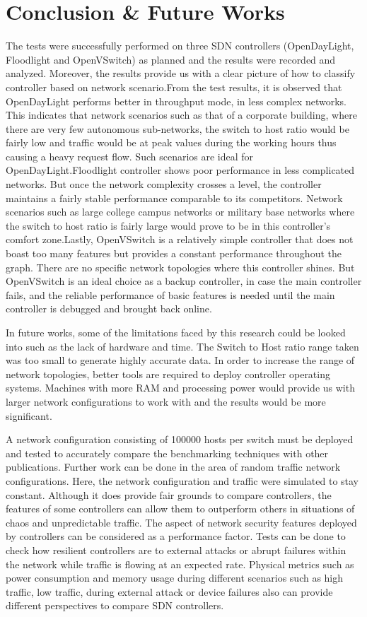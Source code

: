\chapter{Conclusion \& Future Works} 

The tests were successfully performed on three SDN controllers (OpenDayLight, Floodlight and OpenVSwitch) as planned and the results were recorded and analyzed. Moreover, the results provide us with a clear picture of how to classify controller based on network scenario.From the test results, it is observed that OpenDayLight performs better in throughput mode, in less complex networks. This indicates that network scenarios such as that of a corporate building, where there are very few autonomous sub-networks, the switch to host ratio would be fairly low and traffic would be at peak values during the working hours thus causing a heavy request flow. Such scenarios are ideal for OpenDayLight.Floodlight controller shows poor performance in less complicated networks. But once the network complexity crosses a level, the controller maintains a fairly stable performance comparable to its competitors. Network scenarios such as large college campus networks or military base networks where the switch to host ratio is fairly large would prove to be in this controller’s comfort zone.Lastly, OpenVSwitch is a relatively simple controller that does not boast too many features but provides a constant performance throughout the graph. There are no specific network topologies where this controller shines. But OpenVSwitch is an ideal choice as a backup controller, in case the main controller fails, and the reliable performance of basic features is needed until the main controller is debugged and brought back online. 

In future works, some of the limitations faced by this research could be looked into such as the lack of hardware and time. The Switch to Host ratio range taken was too small to generate highly accurate data. In order to increase the range of network topologies, better tools are required to deploy controller operating systems. Machines with more RAM and processing power would provide us with larger network configurations to work with and the results would be more significant.

A network configuration consisting of 100000 hosts per switch must be deployed and tested to accurately compare the benchmarking techniques with other publications. Further work can be done in the area of random traffic network configurations. Here, the network configuration and traffic were simulated to stay constant. Although it does provide fair grounds to compare controllers, the features of some controllers can allow them to outperform others in situations of chaos and unpredictable traffic. The aspect of network security features deployed by controllers can be considered as a performance factor. Tests can be done to check how resilient controllers are to external attacks or abrupt failures within the network while traffic is flowing at an expected rate. Physical metrics such as power consumption and memory usage during different scenarios such as high traffic, low traffic, during external attack or device failures also can provide different perspectives to compare SDN controllers.

